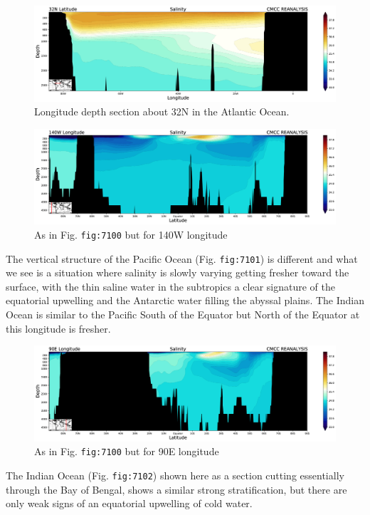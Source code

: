 \begin{figure}
	\centering
	\includegraphics[width = .7 \textwidth]{figs/GD/SectSalinity32N3000.png}
	\caption{Longitude depth section about 32N in the Atlantic Ocean.}
\end{figure}

\begin{figure}
	\centering
	\includegraphics[width = .7 \textwidth]{figs/GD/SectSal140W5000.png}
	\caption{As in Fig. \texttt{fig:7100} but for 140W longitude}
\end{figure}

The vertical structure of the Pacific Ocean (Fig. \texttt{fig:7101}) is
different and what we see is a situation where salinity is slowly
varying getting fresher toward the surface, with the thin saline water
in the subtropics a clear signature of the equatorial upwelling and the
Antarctic water filling the abyssal plains. The Indian Ocean is similar
to the Pacific South of the Equator but North of the Equator at this
longitude is fresher.

\begin{figure}
	\centering
	\includegraphics[width = .7 \textwidth]{figs/GD/SectSal90E5000.png}
	\caption{As in Fig. \texttt{fig:7100} but for 90E longitude}
\end{figure}

The Indian Ocean (Fig. \texttt{fig:7102}) shown here as a section
cutting essentially through the Bay of Bengal, shows a similar strong
stratification, but there are only weak signs of an equatorial upwelling
of cold water.

